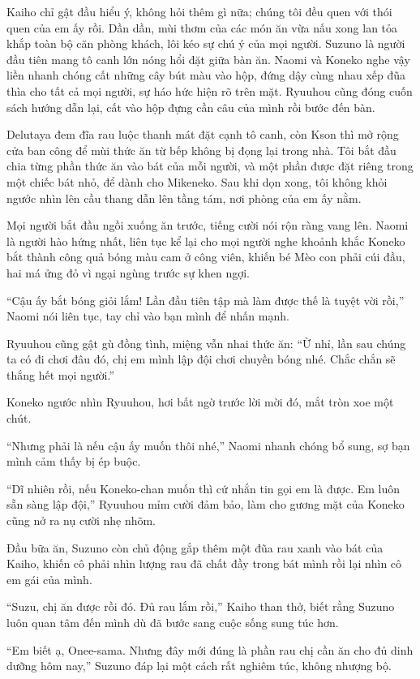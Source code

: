 ﻿\documentclass[../main.tex]{subfiles}
\begin{document}
Kaiho chỉ gật đầu hiểu ý, không hỏi thêm gì nữa; chúng tôi đều quen với thói quen của em ấy rồi. Dần dần, mùi thơm của các món ăn vừa nấu xong lan tỏa khắp toàn bộ căn phòng khách, lôi kéo sự chú ý của mọi người. Suzuno là người đầu tiên mang tô canh lớn nóng hổi đặt giữa bàn ăn. Naomi và Koneko nghe vậy liền nhanh chóng cất những cây bút màu vào hộp, đứng dậy cùng nhau xếp đũa thìa cho tất cả mọi người, sự háo hức hiện rõ trên mặt. Ryuuhou cũng đóng cuốn sách hướng dẫn lại, cất vào hộp đựng cần câu của mình rồi bước đến bàn.

Delutaya đem đĩa rau luộc thanh mát đặt cạnh tô canh, còn Kson thì mở rộng cửa ban công để mùi thức ăn từ bếp không bị đọng lại trong nhà. Tôi bắt đầu chia từng phần thức ăn vào bát của mỗi người, và một phần được đặt riêng trong một chiếc bát nhỏ, để dành cho Mikeneko. Sau khi dọn xong, tôi không khỏi ngước nhìn lên cầu thang dẫn lên tầng tám, nơi phòng của em ấy nằm.

Mọi người bắt đầu ngồi xuống ăn trước, tiếng cười nói rộn ràng vang lên. Naomi là người hào hứng nhất, liên tục kể lại cho mọi người nghe khoảnh khắc Koneko bắt thành công quả bóng màu cam ở công viên, khiến bé Mèo con phải cúi đầu, hai má ửng đỏ vì ngại ngùng trước sự khen ngợi.

``Cậu ấy bắt bóng giỏi lắm! Lần đầu tiên tập mà làm được thế là tuyệt vời rồi,'' Naomi nói liên tục, tay chỉ vào bạn mình để nhấn mạnh.

Ryuuhou cũng gật gù đồng tình, miệng vẫn nhai thức ăn: ``Ừ nhỉ, lần sau chúng ta có đi chơi đâu đó, chị em mình lập đội chơi chuyền bóng nhé. Chắc chắn sẽ thắng hết mọi người.''

Koneko ngước nhìn Ryuuhou, hơi bất ngờ trước lời mời đó, mắt tròn xoe một chút.

``Nhưng phải là nếu cậu ấy muốn thôi nhé,'' Naomi nhanh chóng bổ sung, sợ bạn mình cảm thấy bị ép buộc.

``Dĩ nhiên rồi, nếu Koneko-chan muốn thì cứ nhắn tin gọi em là được. Em luôn sẵn sàng lập đội,'' Ryuuhou mỉm cười đảm bảo, làm cho gương mặt của Koneko cũng nở ra nụ cười nhẹ nhõm.

Đầu bữa ăn, Suzuno còn chủ động gắp thêm một đũa rau xanh vào bát của Kaiho, khiến cô phải nhìn lượng rau đã chất đầy trong bát mình rồi lại nhìn cô em gái của mình.

``Suzu, chị ăn được rồi đó. Đủ rau lắm rồi,'' Kaiho than thở, biết rằng Suzuno luôn quan tâm đến mình dù đã bước sang cuộc sống sung túc hơn.

``Em biết ạ, Onee-sama. Nhưng đây mới đúng là phần rau chị cần ăn cho đủ dinh dưỡng hôm nay,'' Suzuno đáp lại một cách rất nghiêm túc, không nhượng bộ.
\end{document}
